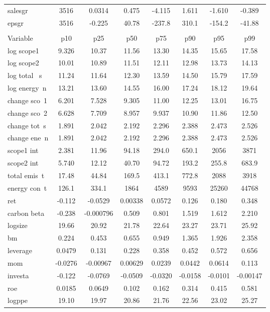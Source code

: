 \documentclass[]{article}
\begin{document}
\begin{tabular}{lccccccc}
salesgr & 3516 & 0.0314 & 0.475 & -4.115 & 1.611 & -1.610 & -0.389 \\
epsgr & 3516 & -0.225 & 40.78 & -237.8 & 310.1 & -154.2 & -41.88 \\
 &  &  &  &  &  &  &  \\
Variable & p10 & p25 & p50 & p75 & p90 & p95 & p99 \\
log scope1 & 9.326 & 10.37 & 11.56 & 13.30 & 14.35 & 15.65 & 17.58 \\
log scope2 & 10.01 & 10.89 & 11.51 & 12.11 & 12.98 & 13.73 & 14.13 \\
log total ~s & 11.24 & 11.64 & 12.30 & 13.59 & 14.50 & 15.79 & 17.59 \\
log energy~n & 13.21 & 13.60 & 14.55 & 16.00 & 17.24 & 18.12 & 19.64 \\
change sco~1 & 6.201 & 7.528 & 9.305 & 11.00 & 12.25 & 13.01 & 16.75 \\
change sco~2 & 6.628 & 7.709 & 8.957 & 9.937 & 10.90 & 11.86 & 12.50 \\
change tot~s & 1.891 & 2.042 & 2.192 & 2.296 & 2.388 & 2.473 & 2.526 \\
change ene~n & 1.891 & 2.042 & 2.192 & 2.296 & 2.388 & 2.473 & 2.526 \\
scope1 int & 2.381 & 11.96 & 94.18 & 294.0 & 650.1 & 2056 & 3871 \\
scope2 int & 5.740 & 12.12 & 40.70 & 94.72 & 193.2 & 255.8 & 683.9 \\
total emis~t & 17.48 & 44.84 & 169.5 & 413.1 & 772.8 & 2088 & 3918 \\
energy con~t & 126.1 & 334.1 & 1864 & 4589 & 9593 & 25260 & 44768 \\
ret & -0.112 & -0.0529 & 0.00338 & 0.0572 & 0.126 & 0.180 & 0.348 \\
carbon beta & -0.238 & -0.000796 & 0.509 & 0.801 & 1.519 & 1.612 & 2.210 \\
logsize & 19.66 & 20.92 & 21.78 & 22.64 & 23.27 & 23.71 & 25.92 \\
bm & 0.224 & 0.453 & 0.655 & 0.949 & 1.365 & 1.926 & 2.358 \\
leverage & 0.0479 & 0.131 & 0.228 & 0.358 & 0.452 & 0.572 & 0.656 \\
mom & -0.0276 & -0.00967 & 0.00629 & 0.0239 & 0.0442 & 0.0614 & 0.113 \\
investa & -0.122 & -0.0769 & -0.0509 & -0.0320 & -0.0158 & -0.0101 & -0.00147 \\
roe & 0.0185 & 0.0649 & 0.102 & 0.162 & 0.314 & 0.415 & 0.581 \\
logppe & 19.10 & 19.97 & 20.86 & 21.76 & 22.56 & 23.02 & 25.27 \\

\end{tabular}
\end{document}
